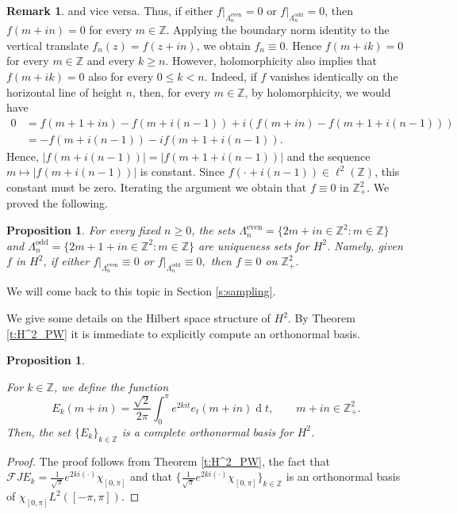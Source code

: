 \documentclass[12pt,a4paper,reqno]{amsart}
\newtheorem{prop}[thm]{Proposition}
\theoremstyle{definition}
\newtheorem{rmk}[thm]{Remark}
\theoremstyle{definition}\newtheorem{defn}[thm]{Definition}
\begin{document}
\begin{rmk}
    and vice versa. Thus, if either $f|_{\Lambda^{\operatorname{even}}_n}=0$ or $f|_{\Lambda^{\operatorname{odd}}_n}=0$, then $f(m+in)=0$ for every $m\in\mathbb Z$. Applying the boundary norm identity to the vertical translate $f_n(z)=f(z+in)$, we obtain $f_n\equiv0$. Hence $f(m+ik)=0$ for every $m\in\mathbb Z$ and every $k\geqslant n$. However, holomorphicity also implies that $f(m+ik)=0$ also for every $0\leqslant k<n$. Indeed, if $f$ vanishes identically on the horizontal line of height $n$, then, for every $m\in\mathbb Z$, by holomorphicity, we would have
     \begin{align*}
     0&=f(m+1+in)-f(m+i(n-1))+i(f(m+in)-f(m+1+i(n-1)))\\
     &=-f(m+i(n-1))-if(m+1+i(n-1)).
     \end{align*}
    Hence, $|f(m+i(n-1))|=|f(m+1+i(n-1))|$ and the sequence $m\mapsto |f(m+i(n-1))|$ is constant. Since $f(\cdot+i(n-1))\in\ell^2(\mathbb Z)$, this constant must be zero. Iterating the argument we obtain that $f\equiv 0$ in $\mathbb Z^2_+$. We proved the following.
    \begin{prop}\label{p:uniqueness}
    For every fixed $n\geqslant 0$, the sets $\Lambda_{n}^{\operatorname{even}}=\{2m+in\in\mathbb Z^2:m\in\mathbb Z\}$ and $\Lambda_{n}^{\operatorname{odd}}=\{2m+1+in\in\mathbb Z^2:m\in\mathbb Z\}$ are uniqueness sets for $H^2$. Namely, given $f$ in $H^2$, if either  
    \(
    f|_{\Lambda_n^{\operatorname{even}}}\equiv 0\) or \(
    f|_{\Lambda_n^{\operatorname{odd}}}\equiv 0,
    \) 
    then \(f\equiv 0\) on $\mathbb Z^2_+$.
    \end{prop}
    \noindent We will come back to this topic in Section \ref{s:sampling}.
    \end{rmk}
    
    We give some details on the Hilbert space structure of $H^2$. By Theorem \ref{t:H^2_PW} it is immediate to explicitly compute an orthonormal basis. 
    \begin{prop}\label{T:ONB}
    
    For $k\in\mathbb{Z}$, we define the function
    \[
    E_k(m+in)=\frac{\sqrt 2}{2\pi}\int_0^\pi e^{2kit}e_t(m+in)\operatorname{d}\!t, \qquad m+in\in\mathbb{Z}^2_+.\]
    Then, the set $\{E_k\}_{k\in\mathbb{Z}}$ is a complete orthonormal basis for $H^2$.
    \end{prop}
    \begin{proof} The proof follows from Theorem \ref{t:H^2_PW}, the fact that $\mathcal{F}JE_k=\frac{1}{\sqrt\pi}e^{2ki(\cdot)}\chi_{[0,\pi]}$ and that $\{\frac{1}{\sqrt\pi} e^{2ki(\cdot)}\chi_{[0,\pi]}\}_{k\in\mathbb{Z}}$ is an orthonormal basis of $\chi_{[0,\pi]}L^2([-\pi,\pi])$.
    \end{proof}
    
\end{document}
